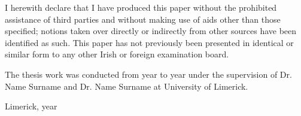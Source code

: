 


\begin{declaration}        %

I herewith declare that I have produced this paper without the prohibited assistance of third parties and without making use of aids other than those specified; notions taken over directly or indirectly from other sources have been identified as such. This paper has not previously been presented in identical or similar form to any other Irish or foreign examination board.

The thesis work was conducted from year to year under the supervision of Dr. Name Surname and Dr. Name Surname at University of Limerick.

\vspace{10mm}

Limerick, year


\end{declaration}


